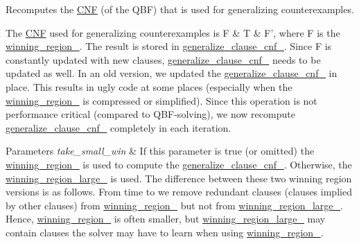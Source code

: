 Recomputes the \hyperlink{classCNF}{C\-N\-F} (of the Q\-B\-F) that is used for generalizing counterexamples. 

The \hyperlink{classCNF}{C\-N\-F} used for generalizing counterexamples is F \& T \& F', where F is the \hyperlink{classLearnSynthQBFInc_abc3503bdb6be7053a7c3d3d7e57858d6}{winning\-\_\-region\-\_\-}. The result is stored in \hyperlink{classLearnSynthQBFInc_ad3d20b7d5e6b561c7cf46324962247ba}{generalize\-\_\-clause\-\_\-cnf\-\_\-}. Since F is constantly updated with new clauses, \hyperlink{classLearnSynthQBFInc_ad3d20b7d5e6b561c7cf46324962247ba}{generalize\-\_\-clause\-\_\-cnf\-\_\-} needs to be updated as well. In an old version, we updated the \hyperlink{classLearnSynthQBFInc_ad3d20b7d5e6b561c7cf46324962247ba}{generalize\-\_\-clause\-\_\-cnf\-\_\-} in place. This results in ugly code at some places (especially when the \hyperlink{classLearnSynthQBFInc_abc3503bdb6be7053a7c3d3d7e57858d6}{winning\-\_\-region\-\_\-} is compressed or simplified). Since this operation is not performance critical (compared to Q\-B\-F-\/solving), we now recompute \hyperlink{classLearnSynthQBFInc_ad3d20b7d5e6b561c7cf46324962247ba}{generalize\-\_\-clause\-\_\-cnf\-\_\-} completely in each iteration.


\begin{DoxyParams}{Parameters}
{\em take\-\_\-small\-\_\-win} & If this parameter is true (or omitted) the \hyperlink{classLearnSynthQBFInc_abc3503bdb6be7053a7c3d3d7e57858d6}{winning\-\_\-region\-\_\-} is used to compute the \hyperlink{classLearnSynthQBFInc_ad3d20b7d5e6b561c7cf46324962247ba}{generalize\-\_\-clause\-\_\-cnf\-\_\-}. Otherwise, the \hyperlink{classLearnSynthQBFInc_a5ef45d9d77b566fca1c5a1e6041f7c86}{winning\-\_\-region\-\_\-large\-\_\-} is used. The difference between these two winning region versions is as follows. From time to we remove redundant clauses (clauses implied by other clauses) from \hyperlink{classLearnSynthQBFInc_abc3503bdb6be7053a7c3d3d7e57858d6}{winning\-\_\-region\-\_\-} but not from \hyperlink{classLearnSynthQBFInc_a5ef45d9d77b566fca1c5a1e6041f7c86}{winning\-\_\-region\-\_\-large\-\_\-}. Hence, \hyperlink{classLearnSynthQBFInc_abc3503bdb6be7053a7c3d3d7e57858d6}{winning\-\_\-region\-\_\-} is often smaller, but \hyperlink{classLearnSynthQBFInc_a5ef45d9d77b566fca1c5a1e6041f7c86}{winning\-\_\-region\-\_\-large\-\_\-} may contain clauses the solver may have to learn when using \hyperlink{classLearnSynthQBFInc_abc3503bdb6be7053a7c3d3d7e57858d6}{winning\-\_\-region\-\_\-}. \\
\hline
\end{DoxyParams}


